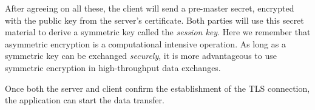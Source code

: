 After agreeing on all these, the client will send a pre-master secret, encrypted
with the public key from the server's certificate. Both parties will use this
secret material to derive a symmetric key called the \textit{session key}. Here
we remember that asymmetric encryption is a computational intensive operation.
As long as a symmetric key can be exchanged \textit{securely}, it is more
advantageous to use symmetric encryption in high-throughput data exchanges.

Once both the server and client confirm the establishment of the TLS connection,
the application can start the data transfer.
